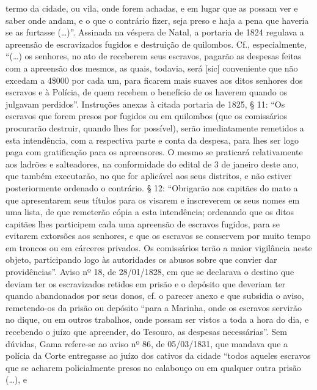 {  termo da cidade, ou vila, onde forem achadas, e em lugar que as possam
  ver e saber onde andam, e o que o contrário fizer, seja preso e haja a
  pena que haveria se as furtasse (\ldots{})''. Assinada na véspera de Natal,
  a portaria de 1824 regulava a apreensão de escravizados fugidos e
  destruição de quilombos. Cf., especialmente, ``(\ldots{}) os senhores, no ato
  de receberem seus escravos, pagarão as despesas feitas com a apreensão
  dos mesmos, as quais, todavia, será {[}sic{]} conveniente que não
  excedam a 4\$000 por cada um, para ficarem mais suaves aos ditos
  senhores dos escravos e à Polícia, de quem recebem o benefício de os
  haverem quando os julgavam perdidos''. Instruções anexas à citada
  portaria de 1825, § 11: ``Os escravos que forem presos por fugidos ou
  em quilombos (que os comissários procurarão destruir, quando lhes for
  possível), serão imediatamente remetidos a esta intendência, com a
  respectiva parte e conta da despesa, para lhes ser logo paga com
  gratificação para os apreensores. O mesmo se praticará relativamente
  aos ladrões e salteadores, na conformidade do edital de 3 de janeiro
  deste ano, que também executarão, no que for aplicável aos seus
  distritos, e não estiver posteriormente ordenado o contrário. § 12:
  ``Obrigarão aos capitães do mato a que apresentarem seus títulos para
  os visarem e inscreverem os seus nomes em uma lista, de que remeterão
  cópia a esta intendência; ordenando que os ditos capitães lhes
  participem cada uma apreensão de escravos fugidos, para se evitarem
  extorsões aos senhores, e que os escravos se conservem por muito tempo
  em troncos ou em cárceres privados. Os comissários terão a maior
  vigilância neste objeto, participando logo às autoridades os abusos
  sobre que convier dar providências''. Aviso nº 18, de 28/01/1828, em
  que se declarava o destino que deviam ter os escravizados retidos em
  prisão e o depósito que deveriam ter quando abandonados por seus
  donos, cf. o parecer anexo e que subsidia o aviso, remetendo-os da
  prisão ou depósito ``para a Marinha, onde os escravos servirão no
  dique, ou em outros trabalhos, onde possam ser vistos a toda a hora do
  dia, e recebendo o juízo que apreender, do Tesouro, as despesas
  necessárias''. Sem dúvidas, Gama refere-se ao aviso nº 86, de
  05/03/1831, que mandava que a polícia da Corte entregasse ao juízo dos
  cativos da cidade ``todos aqueles escravos que se acharem
  policialmente presos no calabouço ou em qualquer outra prisão (\ldots{}), e
}
